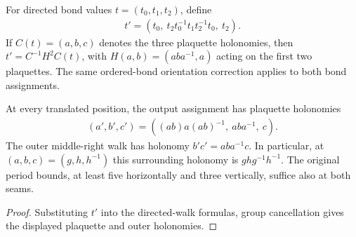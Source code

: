 \begin{definition}%
    \label{def:peps_torus_three_plaquette_double_exchange_transports}
    \leanok
    For directed bond values $t=(t_0,t_1,t_2)$, define
    \begin{align}
        t'=(t_0,\ t_2t_0^{-1}t_1t_2^{-1}t_0,\ t_2).
    \end{align}
    If $C(t)=(a,b,c)$ denotes the three plaquette holonomies, then
    $t'=C^{-1}H^2C(t)$, with $H(a,b)=(aba^{-1},a)$ acting on the first
    two plaquettes. The same ordered-bond orientation correction applies
    to both bond assignments.
\end{definition}

\begin{lemma}%
    \label{thm:peps_torus_three_plaquette_double_exchange_holonomy}
    \leanok
    At every translated position, the output assignment has plaquette
    holonomies
    \begin{align}
        (a',b',c')=((ab)a(ab)^{-1},\ aba^{-1},\ c).
    \end{align}
    The outer middle-right walk has holonomy $b'c'=aba^{-1}c$.
    In particular, at $(a,b,c)=(g,h,h^{-1})$ this surrounding holonomy
    is $ghg^{-1}h^{-1}$.
    The original period bounds, at least five horizontally and three
    vertically, suffice also at both seams.
\end{lemma}

\begin{proof}\leanok
    Substituting $t'$ into the directed-walk formulas,
    group cancellation gives the displayed plaquette and outer holonomies.
\end{proof}

